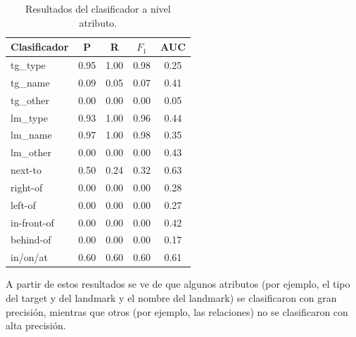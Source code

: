 \begin{table}[h]
\begin{center}
\footnotesize{

\begin{tabular}{l c c c c }
\hline
{{Clasificador}}	& {P} & {R} & {$F_{1}$} & {AUC} \\
\hline
{{tg\_type}} 			& 0.95 & 1.00 & 0.98 & 0.25 \\
{{tg\_name}}			& 0.09 & 0.05 & 0.07 & 0.41 \\
{{tg\_other}}			& 0.00 & 0.00 & 0.00 & 0.05 \\                               
{{lm\_type}}			& 0.93 & 1.00 & 0.96 & 0.44 \\                               
{{lm\_name}}			& 0.97 & 1.00 & 0.98 & 0.35 \\                               
{{lm\_other}}			& 0.00 & 0.00 & 0.00 & 0.43 \\                               
{{next-to}}				& 0.50 & 0.24 & 0.32 & 0.63 \\                               
{{right-of}}			& 0.00 & 0.00 & 0.00 & 0.28 \\                               
{{left-of}}				& 0.00 & 0.00 & 0.00 & 0.27 \\                               
{{in-front-of}}		& 0.00 & 0.00 & 0.00 & 0.42 \\                               
{{behind-of}}			& 0.00 & 0.00 & 0.00 & 0.17 \\                               
{{in/on/at}} 			& 0.60 & 0.60 & 0.60 & 0.61 \\                               
\hline                   
\end{tabular}
\caption{Resultados del clasificador a nivel atributo.}
\label{tab-svm-results}
}
\end{center}
\end{table}
\normalsize


A partir de estos resultados se ve de que algunos atributos (por ejemplo, el tipo del target y del landmark y el nombre del landmark) se clasificaron con gran precisi\'on, mientras que otros (por ejemplo, las relaciones) no se clasificaron con alta precisi\'on.

